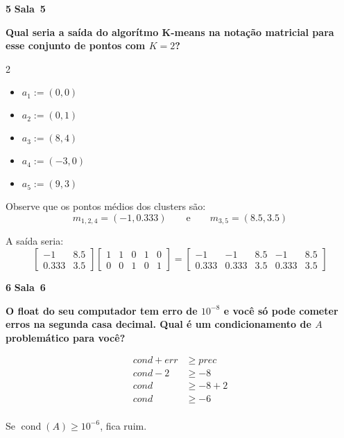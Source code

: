 \documentclass{article}
\DeclareMathOperator*{\cond}{cond}
\newenvironment{question}
    {\medskip\bfseries\large}
    {\medskip}
\newcounter{exe-list}
\newenvironment{exe}[2][Sala]
    {\bigskip\noindent\par\ifthenelse{\equal{#1}{}}%
        {\textbf{\LARGE #2}}%
        {\textbf{\LARGE #1~#2}}%
    \medskip\noindent\par}
    {\bigskip}
\begin{document}
\begin{exe}{5}
    \begin{question}
        Qual seria a saída do algorítmo K-means
        na notação matricial para esse conjunto de pontos
        com \(K = 2\)?
        \begin{multicols}{2} \begin{itemize}
            \item[] \(a_1 := (0, 0)\)
            \item[] \(a_2 := (0, 1)\)
            \item[] \(a_3 := (8, 4)\)
            \item[] \(a_4 := (-3, 0)\)
            \item[] \(a_5 := (9, 3)\)
        \end{itemize} \end{multicols}
    \end{question}

    Observe que os pontos médios dos clusters são:
    \[
        m_{1,2,4} = (- 1, 0.333)
        \qquad\text{e}\qquad
        m_{3,5} = (8.5, 3.5)
    \]

    A saída seria:
    \[
        \begin{bmatrix}
            -1 & 8.5 \\
            0.333 & 3.5
        \end{bmatrix} \begin{bmatrix}
            1 & 1 & 0 & 1 & 0 \\
            0 & 0 & 1 & 0 & 1
        \end{bmatrix} =
        \begin{bmatrix}
            -1 & -1 & 8.5 & -1 & 8.5 \\
            0.333 & 0.333 & 3.5 & 0.333 & 3.5
        \end{bmatrix}
    \]
\end{exe}

\begin{exe}{6}
    \begin{question}
        O float do seu computador tem erro de \(10^{-8}\)
        e você só pode cometer erros na segunda casa decimal.
        Qual é um condicionamento de \(A\)
        problemático para você?
    \end{question}

    \begin{align*}
        cond + err &\ge prec \\
        cond - 2 &\ge -8 \\
        cond &\ge - 8 + 2 \\
        cond &\ge - 6 \\
    \end{align*}

    Se \(\cond(A) \ge 10^{-6}\), fica ruim.
\end{exe}
\end{document}
